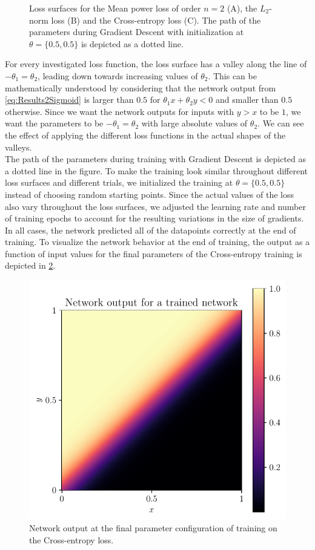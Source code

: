 \begin{figure}
	\caption{Loss surfaces for the Mean power loss of order $n=2$ (A), the $L_2$-norm loss (B) and the Cross-entropy loss (C). The path of the parameters during Gradient Descent with initialization at $\theta = \{0.5, 0.5\}$ is depicted as a dotted line.}
	\label{fig:Results2LossSurfaces}
\end{figure}
For every investigated loss function, the loss surface has a valley along the line of $-\theta_1 = \theta_2$, leading down towards increasing values of  $\theta_2$. This can be mathematically understood by considering that the network output from \cref{eq:Results2Sigmoid} is larger than $0.5$ for $\theta_1x + \theta_2y < 0$ and smaller than $0.5$ otherwise. Since we want the network outputs for inputs with $y>x$ to be $1$, we want the parameters to be $-\theta_1 = \theta_2$ with large absolute values of $\theta_2$. We can see the effect of applying the different loss functions in the actual shapes of the valleys.\\
The path of the parameters during training with Gradient Descent is depicted as a dotted line in the figure. To make the training look similar throughout different loss surfaces and different trials, we initialized the training at $\theta = \{0.5, 0.5\}$ instead of choosing random starting points. Since the actual values of the loss also vary throughout the loss surfaces, we adjusted the learning rate and number of training epochs to account for the resulting variations in the size of gradients. In all cases, the network predicted all of the datapoints correctly at the end of training. To visualize the network behavior at the end of training, the output as a function of input values for the final parameters of the Cross-entropy training is depicted in \cref{fig:Results2NetworkOutput}.\\
\begin{figure}
	\centering
	\includegraphics{Experiment2/plots/Network_output.pdf}
	\caption{Network output at the final parameter configuration of training on the Cross-entropy loss.}
	\label{fig:Results2NetworkOutput}	
\end{figure}
